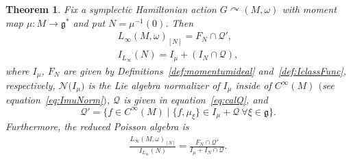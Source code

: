 \documentclass[pdftex]{sigma}
\numberwithin{equation}{section}
\newtheorem{Theorem}{Theorem}[section]
\DeclareMathOperator{\action}{\curvearrowright}
\newcommand{\g}{\mathfrak{g}}
\begin{document}
\begin{Theorem}\label{thm:LinftyRedSymp}
	Fix a symplectic Hamiltonian action $G\action (M,\omega)$ with moment map $\mu\colon M\to\g^*$ and put $N=\mu^{-1}(0)$.
	Then
	\begin{gather*}
			L_\infty(M,\omega)_{[N]} = F_N \cap \mathcal{Q}', \\
			I_{L_\infty}{(N)} = I_\mu + (I_N \cap \mathcal{Q} ),
	\end{gather*}
	where $I_\mu$, $F_N$ are given by Definitions~{\rm \ref{def:momentumideal}} and~{\rm \ref{def:IclassFunc}}, respectively, $\mathcal{N}\bigl(I_\mu\bigr)$ is the Lie algebra normalizer of $I_\mu$ inside of $C^\infty(M)$ $($see equation~\eqref{eq:ImuNorm}$)$, $\mathcal{Q}$ is given in equation~\eqref{eq:calQ}, and
	\begin{equation}
	\label{eq:calQprime}
	 \mathcal{Q}'=
		\lbrace
			f \in C^\infty(M)
		\mid
			\{ f, \mu_\xi\}\in I_\mu + \mathcal{Q}\  \forall \xi \in \g
		\rbrace		.			
	\end{equation}
	Furthermore, the reduced Poisson algebra is
\begin{align}\label{eq:1plred}
		\frac{L_\infty(M,\omega)_{[N]}}{I_{L_\infty}{(N)}} = \frac{F_N\cap\mathcal{Q}'}{I_\mu+I_N\cap \mathcal{Q}}.
\end{align}
\end{Theorem}
\end{document}
